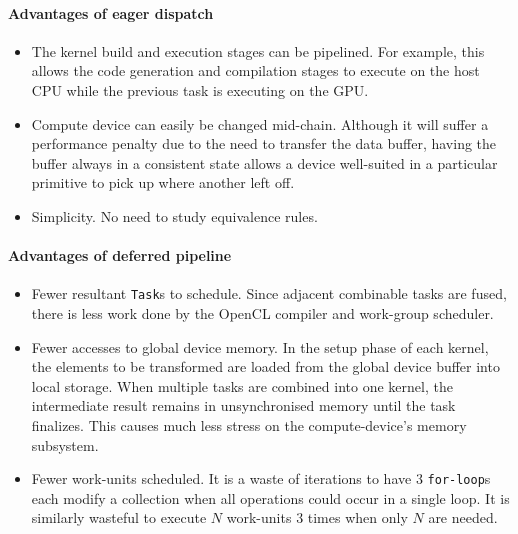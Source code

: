 \paragraph*{Advantages of eager dispatch}
\begin{itemize}
\item The kernel build and execution stages can be pipelined. For example, this allows the code generation and compilation stages to execute on the host \ac{CPU} while the previous task is executing on the \ac{GPU}.

\item Compute device can easily be changed mid-chain. Although it will suffer a performance penalty due to the need to transfer the data buffer, having the buffer always in a consistent state allows a device well-suited in a particular primitive to pick up where another left off.

\item Simplicity. No need to study equivalence rules.
\end{itemize}

\paragraph*{Advantages of deferred pipeline}
\begin{itemize}
\item Fewer resultant \verb|Task|s to schedule. Since adjacent combinable tasks are fused, there is less work done by the \ac{OpenCL} compiler and work-group scheduler.

\item Fewer accesses to global device memory. In the setup phase of each kernel, the elements to be transformed are loaded from the global device buffer into local storage. When multiple tasks are combined into one kernel, the intermediate result remains in unsynchronised memory until the task finalizes. This causes much less stress on the compute-device's memory subsystem.

\item Fewer work-units scheduled. It is a waste of iterations to have $3$ \verb|for-loop|s each modify a collection when all operations could occur in a single loop. It is similarly wasteful to execute $N$ work-units $3$ times when only $N$ are needed.
\end{itemize}


